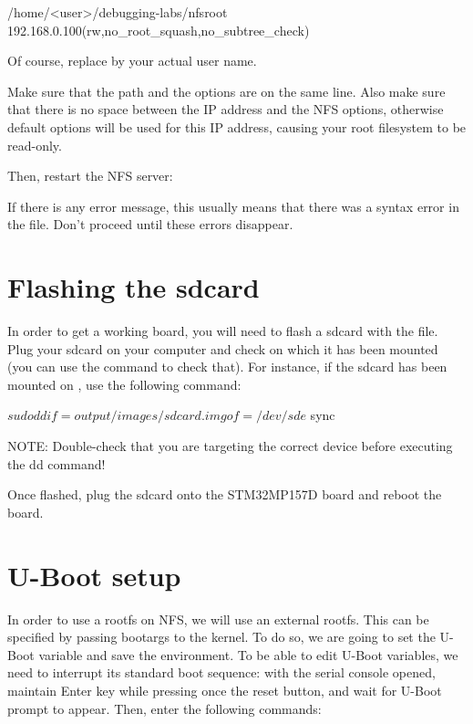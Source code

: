 \scriptsize
\begin{bashinput}
/home/<user>/debugging-labs/nfsroot 192.168.0.100(rw,no_root_squash,no_subtree_check)
\end{bashinput}
\normalsize

Of course, replace  by your actual user name.

Make sure that the path and the options are on the same line.
Also make sure that there is no space between the IP address and the NFS
options, otherwise default options will be used for this IP address,
causing your root filesystem to be read-only.

Then, restart the NFS server:


If there is any error message, this usually means that there was a
syntax error in the  file. Don't proceed until these
errors disappear.

\section{Flashing the sdcard}

In order to get a working board, you will need to flash a sdcard with the 
 file. Plug your sdcard on your computer and
check on which  it has been mounted (you can use the 
command to check that). For instance, if the sdcard has been mounted on
, use the following command:

\begin{bashinput}
$ sudo dd if=output/images/sdcard.img of=/dev/sde
$ sync
\end{bashinput}

NOTE: Double-check that you are targeting the correct device before executing
the dd command!

Once flashed, plug the sdcard onto the STM32MP157D board and reboot the board.

\section{U-Boot setup}

In order to use a rootfs on NFS, we will use an external rootfs. This can be
specified by passing bootargs to the kernel. To do so, we are going to set the
 U-Boot variable and save the environment. To be able to edit
U-Boot variables, we need to interrupt its standard boot sequence: with the
serial console opened, maintain Enter key while pressing once the reset button,
and wait for U-Boot prompt to appear. Then, enter the following commands:


